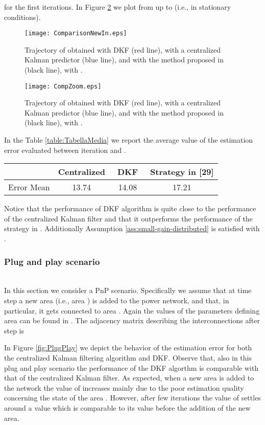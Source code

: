 \documentclass[journal,10pt,draftcls,onecolumn]{IEEEtran}
\begin{document}
for the first  iterations. In Figure \ref{fig:Comparison1} we plot  from  up to  (i.e., in stationary conditions).
\begin{figure}
\centering
\texttt{[image: ComparisonNewIn.eps]}
\caption{Trajectory of  obtained with DKF (red line), with a centralized Kalman predictor (blue line), and with the method proposed in \cite{Negenborn-Kalman13} (black line), with .}
\label{fig:Comparison}
\end{figure}
\begin{figure}
\centering
\texttt{[image: CompZoom.eps]}
\caption{Trajectory of  obtained with DKF (red line), with a centralized Kalman predictor (blue line), and with the method proposed in \cite{Negenborn-Kalman13} (black line), with .}
\label{fig:Comparison1}
\end{figure}
In the Table \ref{table:TabellaMedia} we report the average value of the estimation error evaluated between iteration  and .
\begin{center}
\begin{tabular}{r|c|c|c|}\label{table:TabellaMedia}
&Centralized&\,\,\,DKF\,\,\,& Strategy in [29]\\ \hline
Error Mean&13.74&14.08&17.21 \\ \hline
\end{tabular}
\end{center}
Notice that the performance of DKF algorithm is quite close to the performance of the centralized Kalman filter and that it outperforms the performance of the strategy in \cite{Negenborn-Kalman13}. Additionally Assumption \ref{ass:small-gain-distributed} is satisfied with .

\subsubsection{Plug and play scenario}\label{ex:PlugPlay}\hfill\\
In this section we consider a PnP scenario. Specifically we assume that at time step  a new area (i.e., area ) is added to the power network, and that, in particular, it gets connected to area . Again the values of the parameters defining area  can be found in \cite{SR-GFT:12}. The adjacency matrix describing the interconnections after step  is

In Figure \ref{fig:PlugPlay} we depict the behavior of the estimation error for both the centralized Kalman filtering algorithm and DKF. Observe that, also in this plug and play scenario the performance of the DKF algorthm is comparable with that of the centralized Kalman filter.
As expected, when a new area is added to the network the value of  increases mainly due to the poor estimation quality concerning the state of the area . However, after few iterations the value of  settles around a value which is comparable to its value before the addition of the new area.
\end{document}
